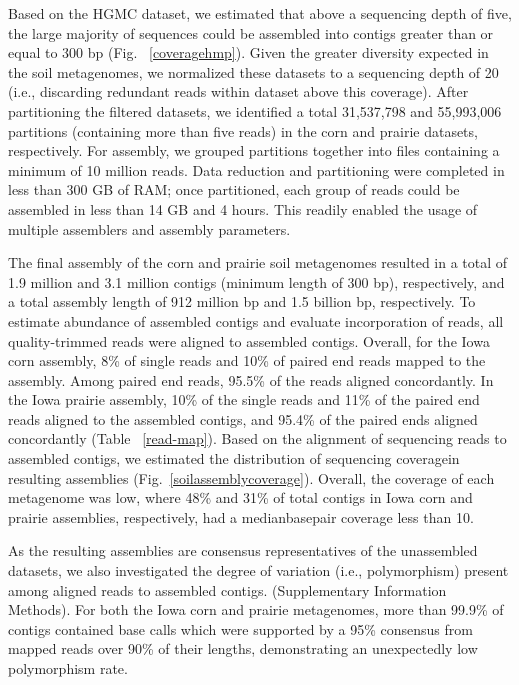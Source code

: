 \documentclass{pnastwo}
\begin{document}
\begin{article}
Based on the HGMC dataset, we estimated that above a sequencing depth of five,
the large majority of sequences could be assembled into contigs greater than or
equal to 300 bp (Fig. ~\ref{coveragehmp}). Given the greater diversity expected in
the soil metagenomes, we normalized these datasets to a sequencing depth of 20
(i.e., discarding redundant reads within dataset above this coverage). After
partitioning the filtered datasets, we identified a total 31,537,798 and
55,993,006 partitions (containing more than five reads) in the corn and prairie
datasets, respectively. For assembly, we grouped partitions together into files
containing a minimum of 10 million reads. Data reduction and partitioning were
completed in less than 300 GB of RAM; once partitioned, each group of reads
could be assembled in less than 14 GB and 4 hours. This readily enabled the
usage of multiple assemblers and assembly parameters.

The final assembly of the corn and prairie soil metagenomes resulted in a total
of 1.9 million and 3.1 million contigs (minimum length of 300 bp), respectively,
and a total assembly length of 912 million bp and 1.5 billion bp, respectively.
To estimate abundance of assembled contigs and evaluate incorporation of reads,
all quality-trimmed reads were aligned to assembled contigs. Overall, for the
Iowa corn assembly, 8\% of single reads and 10\% of paired end reads mapped to
the assembly. Among paired end reads, 95.5\% of the reads aligned concordantly.
In the Iowa prairie assembly, 10\% of the single reads and 11\% of the paired
end reads aligned to the assembled contigs, and 95.4\% of the paired ends
aligned concordantly (Table ~\ref{read-map}). Based on the alignment of
sequencing reads to assembled contigs, we estimated the distribution of
sequencing coveragein resulting assemblies (Fig.~\ref{soilassemblycoverage}).
Overall, the coverage of each metagenome was low, where 48\% and 31\% of total
contigs in Iowa corn and prairie assemblies, respectively, had a medianbasepair
coverage less than 10.

As the resulting assemblies are consensus representatives of the unassembled
datasets, we also investigated the degree of variation (i.e., polymorphism)
present among aligned reads to assembled contigs. (Supplementary Information
Methods). For both the Iowa corn and prairie metagenomes, more than 99.9\% of
contigs contained base calls which were supported by a 95\% consensus from
mapped reads over 90\% of their lengths, demonstrating an unexpectedly low
polymorphism rate.
 

\end{article}
\end{document}
